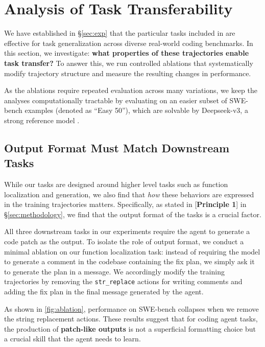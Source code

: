 \section{Analysis of Task Transferability}
\label{sec:controlled-exp}

We have established in \S\ref{sec:exp} that the particular tasks included in \hybridmethodname are effective for task generalization across diverse real-world coding benchmarks. 
In this section, we investigate: \textbf{what properties of these trajectories enable task transfer?}
To answer this, we run controlled ablations that systematically modify trajectory structure and measure the resulting changes in performance.

As the ablations require repeated evaluation across many variations, we keep the analyses computationally tractable by evaluating on an easier subset of SWE-bench examples (denoted as ``Easy 50''), which are solvable by Deepseek-v3, a strong reference model \cite{deepseekv3}. 


\subsection{Output Format Must Match Downstream Tasks}
While our tasks are designed around higher level tasks such as function localization and generation, we also find that \textit{how} these behaviors are expressed in the training trajectories matters. Specifically, as stated in [\textbf{Principle 1}] in \S\ref{sec:methodology}, we find that the output format of the tasks is a crucial factor.

All three downstream tasks in our experiments require the agent to generate a code patch as the output. To isolate the role of output format, we conduct a minimal ablation on our function localization task: instead of requiring the model to generate a comment in the codebase containing the fix plan, we simply ask it to generate the plan in a message.
We accordingly modify the training trajectories by removing the \texttt{str\_replace} actions for writing comments and adding the fix plan in the final message generated by the agent.

As shown in \autoref{fig:ablation}, performance on SWE-bench collapses when we remove the string replacement actions. These results suggest that for coding agent tasks, the production of \textbf{patch-like outputs} is not a superficial formatting choice but a crucial skill that the agent needs to learn. 


